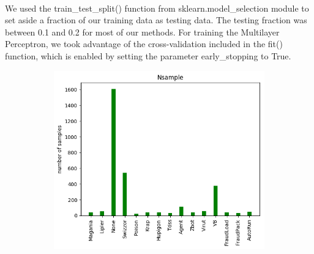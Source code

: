 \documentclass[11pt]{article}
\begin{document}
\paragraph{} We used the train\_test\_split() function from sklearn.model\_selection module to set aside a fraction of our training data as testing data. The testing fraction was between 0.1 and 0.2 for most of our methods. For training the Multilayer Perceptron, we took advantage of the cross-validation included in the fit() function, which is enabled by setting the parameter early\_stopping to True.\\
\begin{figure}[] 
\centering
    \begin{subfigure}[!t]{0.3\textwidth}
        \includegraphics[width=\textwidth]{Plots/Nsample.png}
    \end{subfigure}
        \begin{subfigure}[!t]{0.3\textwidth}

\end{subfigure}
\end{figure}
\end{document}

